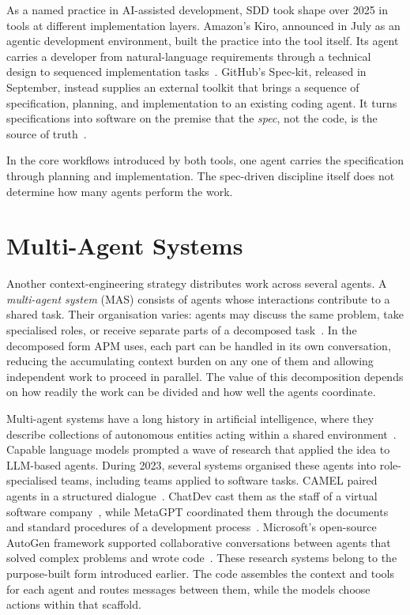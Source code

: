 As a named practice in AI-assisted development, SDD took shape over 2025 in tools at different implementation layers. Amazon's Kiro, announced in July as an agentic development environment, built the practice into the tool itself. Its agent carries a developer from natural-language requirements through a technical design to sequenced implementation tasks~\cite{swaminathan2025kiro}. GitHub's Spec-kit, released in September, instead supplies an external toolkit that brings a sequence of specification, planning, and implementation to an existing coding agent. It turns specifications into software on the premise that the \emph{spec}, not the code, is the source of truth~\cite{delimarsky2025speckit}.

In the core workflows introduced by both tools, one agent carries the specification through planning and implementation. The spec-driven discipline itself does not determine how many agents perform the work.

\section{Multi-Agent Systems}
\label{sec:background-multi-agent-systems}

Another context-engineering strategy distributes work across several agents. A \emph{multi-agent system} (MAS) consists of agents whose interactions contribute to a shared task. Their organisation varies: agents may discuss the same problem, take specialised roles, or receive separate parts of a decomposed task~\cite{cemri2025masfail}. In the decomposed form APM uses, each part can be handled in its own conversation, reducing the accumulating context burden on any one of them and allowing independent work to proceed in parallel. The value of this decomposition depends on how readily the work can be divided and how well the agents coordinate.

Multi-agent systems have a long history in artificial intelligence, where they describe collections of autonomous entities acting within a shared environment~\cite{russell2021aima}. Capable language models prompted a wave of research that applied the idea to LLM-based agents. During 2023, several systems organised these agents into role-specialised teams, including teams applied to software tasks. CAMEL paired agents in a structured dialogue~\cite{li2023camel}. ChatDev cast them as the staff of a virtual software company~\cite{qian2024chatdev}, while MetaGPT coordinated them through the documents and standard procedures of a development process~\cite{hong2024metagpt}. Microsoft's open-source AutoGen framework supported collaborative conversations between agents that solved complex problems and wrote code~\cite{wu2024autogen}. These research systems belong to the purpose-built form introduced earlier. The code assembles the context and tools for each agent and routes messages between them, while the models choose actions within that scaffold.

